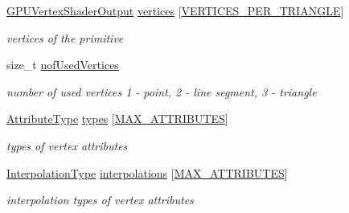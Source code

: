 \begin{DoxyCompactItemize}
\item 
\hypertarget{structGPUPrimitive_a18413cb45917a0f4a519d4807c06a1b6}{\hyperlink{structGPUVertexShaderOutput}{G\-P\-U\-Vertex\-Shader\-Output} \hyperlink{structGPUPrimitive_a18413cb45917a0f4a519d4807c06a1b6}{vertices} \mbox{[}\hyperlink{fwd_8h_a67df0e09b776eea53360bcc8f4a82ac9}{V\-E\-R\-T\-I\-C\-E\-S\-\_\-\-P\-E\-R\-\_\-\-T\-R\-I\-A\-N\-G\-L\-E}\mbox{]}}\label{structGPUPrimitive_a18413cb45917a0f4a519d4807c06a1b6}

\begin{DoxyCompactList}\small\item\em vertices of the primitive \end{DoxyCompactList}\item 
\hypertarget{structGPUPrimitive_aaeea5342673689813c4aff110677d403}{size\-\_\-t \hyperlink{structGPUPrimitive_aaeea5342673689813c4aff110677d403}{nof\-Used\-Vertices}}\label{structGPUPrimitive_aaeea5342673689813c4aff110677d403}

\begin{DoxyCompactList}\small\item\em number of used vertices 1 -\/ point, 2 -\/ line segment, 3 -\/ triangle \end{DoxyCompactList}\item 
\hypertarget{structGPUPrimitive_abf05f0fa2a0b01eddf768d0f8daf0fb9}{\hyperlink{program_8h_a349a9cde14be8097df865ba0469c0ab2}{Attribute\-Type} \hyperlink{structGPUPrimitive_abf05f0fa2a0b01eddf768d0f8daf0fb9}{types} \mbox{[}\hyperlink{fwd_8h_a4d992a1f9192388588184753115f6c03}{M\-A\-X\-\_\-\-A\-T\-T\-R\-I\-B\-U\-T\-E\-S}\mbox{]}}\label{structGPUPrimitive_abf05f0fa2a0b01eddf768d0f8daf0fb9}

\begin{DoxyCompactList}\small\item\em types of vertex attributes \end{DoxyCompactList}\item 
\hypertarget{structGPUPrimitive_a52b0316277ee6ac63d4e898ea3bb1864}{\hyperlink{program_8h_a8472f01c511d77bbfb981a46618ea1ea}{Interpolation\-Type} \hyperlink{structGPUPrimitive_a52b0316277ee6ac63d4e898ea3bb1864}{interpolations} \mbox{[}\hyperlink{fwd_8h_a4d992a1f9192388588184753115f6c03}{M\-A\-X\-\_\-\-A\-T\-T\-R\-I\-B\-U\-T\-E\-S}\mbox{]}}\label{structGPUPrimitive_a52b0316277ee6ac63d4e898ea3bb1864}

\begin{DoxyCompactList}\small\item\em interpolation types of vertex attributes \end{DoxyCompactList}\end{DoxyCompactItemize}


